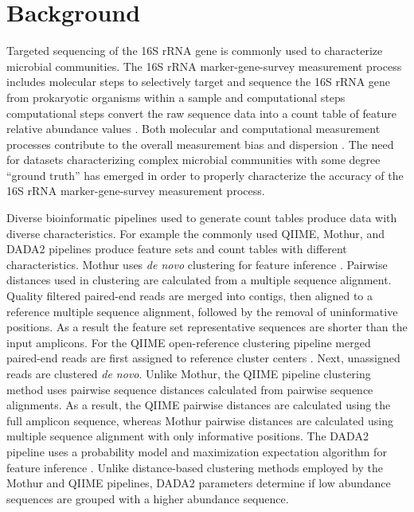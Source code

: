 \documentclass[linenumbers]{bmcart}
\begin{document}
\section*{Background}

Targeted sequencing of the 16S rRNA gene is commonly used to characterize
microbial communities. The 16S rRNA marker-gene-survey
measurement process includes molecular steps to selectively target and sequence the 16S rRNA
gene from prokaryotic organisms within a sample and
computational steps \cite{Goodrich2014} computational steps
convert the raw sequence data into a count table of feature relative abundance values
\cite{Goodrich2014}. Both molecular and computational measurement
processes contribute to the overall measurement bias and dispersion
\cite{Amore2016, Goodrich2014, brooks2015truth}. The need for datasets characterizing complex microbial communities with
some degree ``ground truth'' has emerged in order to properly characterize the accuracy of the 16S rRNA
marker-gene-survey measurement process.

Diverse bioinformatic pipelines used to generate count tables produce data with diverse characteristics.
For example the commonly used QIIME, Mothur, and
DADA2 pipelines produce feature sets and count tables with different characteristics. 
Mothur uses \emph{de novo} clustering for feature
inference \cite{westcott2017opticlust, schloss2009introducing}.
Pairwise distances used in clustering are calculated from a multiple
sequence alignment. Quality filtered paired-end reads are merged
into contigs, then aligned to a reference multiple
sequence alignment, followed by the removal of uninformative positions.
As a result the feature set representative sequences are shorter than the input amplicons. 
For the QIIME open-reference clustering pipeline merged paired-end reads are first assigned to reference cluster
centers \cite{Rideout2014, Caporaso2010}. 
Next, unassigned reads are clustered \emph{de novo}. 
Unlike Mothur, the QIIME pipeline clustering method uses pairwise sequence distances calculated from pairwise sequence alignments. 
As a result, the QIIME pairwise distances are calculated using the full amplicon sequence, 
whereas Mothur pairwise distances are calculated using multiple sequence alignment with only informative positions.
The DADA2 pipeline uses a probability model and maximization expectation algorithm for feature inference \cite{callahan2016dada2}. 
Unlike distance-based clustering methods employed by the Mothur and QIIME pipelines, 
DADA2 parameters determine if low abundance sequences are grouped with a higher abundance sequence.
\end{document}
